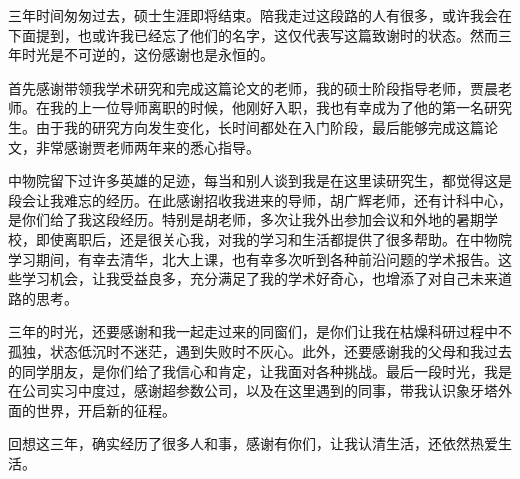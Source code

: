 






三年时间匆匆过去，硕士生涯即将结束。陪我走过这段路的人有很多，或许我会在下面提到，也或许我已经忘了他们的名字，这仅代表写这篇致谢时的状态。然而三年时光是不可逆的，这份感谢也是永恒的。

首先感谢带领我学术研究和完成这篇论文的老师，我的硕士阶段指导老师，贾晨老师。在我的上一位导师离职的时候，他刚好入职，我也有幸成为了他的第一名研究生。由于我的研究方向发生变化，长时间都处在入门阶段，最后能够完成这篇论文，非常感谢贾老师两年来的悉心指导。

中物院留下过许多英雄的足迹，每当和别人谈到我是在这里读研究生，都觉得这是段会让我难忘的经历。在此感谢招收我进来的导师，胡广辉老师，还有计科中心，是你们给了我这段经历。特别是胡老师，多次让我外出参加会议和外地的暑期学校，即使离职后，还是很关心我，对我的学习和生活都提供了很多帮助。在中物院学习期间，有幸去清华，北大上课，也有幸多次听到各种前沿问题的学术报告。这些学习机会，让我受益良多，充分满足了我的学术好奇心，也增添了对自己未来道路的思考。

三年的时光，还要感谢和我一起走过来的同窗们，是你们让我在枯燥科研过程中不孤独，状态低沉时不迷茫，遇到失败时不灰心。此外，还要感谢我的父母和我过去的同学朋友，是你们给了我信心和肯定，让我面对各种挑战。最后一段时光，我是在公司实习中度过，感谢超参数公司，以及在这里遇到的同事，带我认识象牙塔外面的世界，开启新的征程。

回想这三年，确实经历了很多人和事，感谢有你们，让我认清生活，还依然热爱生活。
